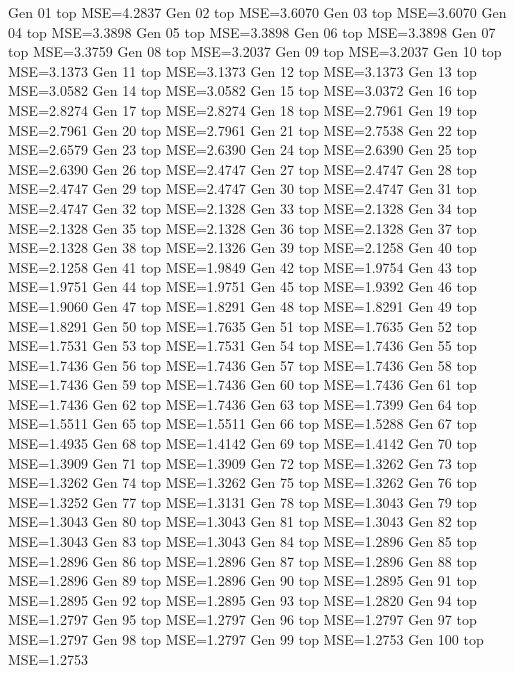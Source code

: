 Gen 01 top MSE=4.2837
Gen 02 top MSE=3.6070
Gen 03 top MSE=3.6070
Gen 04 top MSE=3.3898
Gen 05 top MSE=3.3898
Gen 06 top MSE=3.3898
Gen 07 top MSE=3.3759
Gen 08 top MSE=3.2037
Gen 09 top MSE=3.2037
Gen 10 top MSE=3.1373
Gen 11 top MSE=3.1373
Gen 12 top MSE=3.1373
Gen 13 top MSE=3.0582
Gen 14 top MSE=3.0582
Gen 15 top MSE=3.0372
Gen 16 top MSE=2.8274
Gen 17 top MSE=2.8274
Gen 18 top MSE=2.7961
Gen 19 top MSE=2.7961
Gen 20 top MSE=2.7961
Gen 21 top MSE=2.7538
Gen 22 top MSE=2.6579
Gen 23 top MSE=2.6390
Gen 24 top MSE=2.6390
Gen 25 top MSE=2.6390
Gen 26 top MSE=2.4747
Gen 27 top MSE=2.4747
Gen 28 top MSE=2.4747
Gen 29 top MSE=2.4747
Gen 30 top MSE=2.4747
Gen 31 top MSE=2.4747
Gen 32 top MSE=2.1328
Gen 33 top MSE=2.1328
Gen 34 top MSE=2.1328
Gen 35 top MSE=2.1328
Gen 36 top MSE=2.1328
Gen 37 top MSE=2.1328
Gen 38 top MSE=2.1326
Gen 39 top MSE=2.1258
Gen 40 top MSE=2.1258
Gen 41 top MSE=1.9849
Gen 42 top MSE=1.9754
Gen 43 top MSE=1.9751
Gen 44 top MSE=1.9751
Gen 45 top MSE=1.9392
Gen 46 top MSE=1.9060
Gen 47 top MSE=1.8291
Gen 48 top MSE=1.8291
Gen 49 top MSE=1.8291
Gen 50 top MSE=1.7635
Gen 51 top MSE=1.7635
Gen 52 top MSE=1.7531
Gen 53 top MSE=1.7531
Gen 54 top MSE=1.7436
Gen 55 top MSE=1.7436
Gen 56 top MSE=1.7436
Gen 57 top MSE=1.7436
Gen 58 top MSE=1.7436
Gen 59 top MSE=1.7436
Gen 60 top MSE=1.7436
Gen 61 top MSE=1.7436
Gen 62 top MSE=1.7436
Gen 63 top MSE=1.7399
Gen 64 top MSE=1.5511
Gen 65 top MSE=1.5511
Gen 66 top MSE=1.5288
Gen 67 top MSE=1.4935
Gen 68 top MSE=1.4142
Gen 69 top MSE=1.4142
Gen 70 top MSE=1.3909
Gen 71 top MSE=1.3909
Gen 72 top MSE=1.3262
Gen 73 top MSE=1.3262
Gen 74 top MSE=1.3262
Gen 75 top MSE=1.3262
Gen 76 top MSE=1.3252
Gen 77 top MSE=1.3131
Gen 78 top MSE=1.3043
Gen 79 top MSE=1.3043
Gen 80 top MSE=1.3043
Gen 81 top MSE=1.3043
Gen 82 top MSE=1.3043
Gen 83 top MSE=1.3043
Gen 84 top MSE=1.2896
Gen 85 top MSE=1.2896
Gen 86 top MSE=1.2896
Gen 87 top MSE=1.2896
Gen 88 top MSE=1.2896
Gen 89 top MSE=1.2896
Gen 90 top MSE=1.2895
Gen 91 top MSE=1.2895
Gen 92 top MSE=1.2895
Gen 93 top MSE=1.2820
Gen 94 top MSE=1.2797
Gen 95 top MSE=1.2797
Gen 96 top MSE=1.2797
Gen 97 top MSE=1.2797
Gen 98 top MSE=1.2797
Gen 99 top MSE=1.2753
Gen 100 top MSE=1.2753

